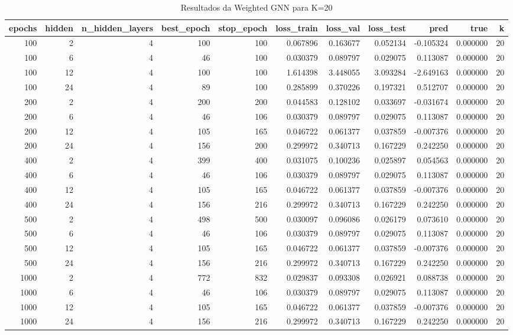 \begin{table}
\caption{Resultados da Weighted GNN para K=20}
\label{tab:weighted_gnn_results_k20}
\begin{tabular}{rrrrrrrrrrr}
\toprule
epochs & hidden & n\_hidden\_layers & best\_epoch & stop\_epoch & loss\_train & loss\_val & loss\_test & pred & true & k \\
\midrule
100 & 2 & 4 & 100 & 100 & 0.067896 & 0.163677 & 0.052134 & -0.105324 & 0.000000 & 20 \\
100 & 6 & 4 & 46 & 100 & 0.030379 & 0.089797 & 0.029075 & 0.113087 & 0.000000 & 20 \\
100 & 12 & 4 & 100 & 100 & 1.614398 & 3.448055 & 3.093284 & -2.649163 & 0.000000 & 20 \\
100 & 24 & 4 & 89 & 100 & 0.285899 & 0.370226 & 0.197321 & 0.512707 & 0.000000 & 20 \\
200 & 2 & 4 & 200 & 200 & 0.044583 & 0.128102 & 0.033697 & -0.031674 & 0.000000 & 20 \\
200 & 6 & 4 & 46 & 106 & 0.030379 & 0.089797 & 0.029075 & 0.113087 & 0.000000 & 20 \\
200 & 12 & 4 & 105 & 165 & 0.046722 & 0.061377 & 0.037859 & -0.007376 & 0.000000 & 20 \\
200 & 24 & 4 & 156 & 200 & 0.299972 & 0.340713 & 0.167229 & 0.242250 & 0.000000 & 20 \\
400 & 2 & 4 & 399 & 400 & 0.031075 & 0.100236 & 0.025897 & 0.054563 & 0.000000 & 20 \\
400 & 6 & 4 & 46 & 106 & 0.030379 & 0.089797 & 0.029075 & 0.113087 & 0.000000 & 20 \\
400 & 12 & 4 & 105 & 165 & 0.046722 & 0.061377 & 0.037859 & -0.007376 & 0.000000 & 20 \\
400 & 24 & 4 & 156 & 216 & 0.299972 & 0.340713 & 0.167229 & 0.242250 & 0.000000 & 20 \\
500 & 2 & 4 & 498 & 500 & 0.030097 & 0.096086 & 0.026179 & 0.073610 & 0.000000 & 20 \\
500 & 6 & 4 & 46 & 106 & 0.030379 & 0.089797 & 0.029075 & 0.113087 & 0.000000 & 20 \\
500 & 12 & 4 & 105 & 165 & 0.046722 & 0.061377 & 0.037859 & -0.007376 & 0.000000 & 20 \\
500 & 24 & 4 & 156 & 216 & 0.299972 & 0.340713 & 0.167229 & 0.242250 & 0.000000 & 20 \\
1000 & 2 & 4 & 772 & 832 & 0.029837 & 0.093308 & 0.026921 & 0.088738 & 0.000000 & 20 \\
1000 & 6 & 4 & 46 & 106 & 0.030379 & 0.089797 & 0.029075 & 0.113087 & 0.000000 & 20 \\
1000 & 12 & 4 & 105 & 165 & 0.046722 & 0.061377 & 0.037859 & -0.007376 & 0.000000 & 20 \\
1000 & 24 & 4 & 156 & 216 & 0.299972 & 0.340713 & 0.167229 & 0.242250 & 0.000000 & 20 \\
\bottomrule
\end{tabular}
\end{table}
